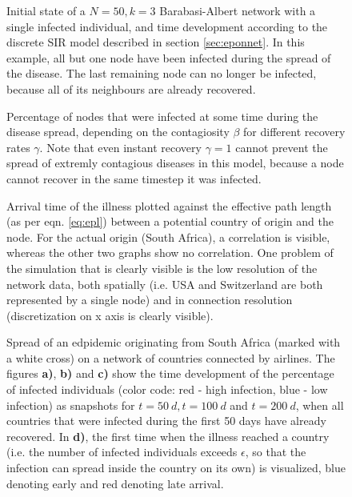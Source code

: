 \documentclass{scrartcl}
\begin{document}
\begin{figure}
    \centering
    \def\svgwidth{0.9\textwidth}
    
    \caption{Initial state of a $N=50, k=3$ Barabasi-Albert network with a single infected individual, and time development according to the discrete SIR model described in section \ref{sec:eponnet}. In this example, all but one node have been infected during the spread of the disease. The last remaining node can no longer be infected, because all of its neighbours are already recovered.}
    \label{fig:D11}
\end{figure}

\begin{figure}
    \centering
    \caption{Percentage of nodes that were infected at some time during the disease spread, 
		depending on the contagiosity $\beta$ for different recovery rates $\gamma$. Note that 
		even instant recovery $\gamma=1$ cannot prevent the spread of extremly contagious diseases
		in this model, because a node cannot recover in the same timestep it was infected.}
    \label{fig:D12}
\end{figure}

\begin{figure}
    \centering
    \caption{Arrival time of the illness plotted against the effective path length  (as per eqn. \ref{eq:epl}) between 
		a potential country of origin and the node. For the actual origin (South Africa), a correlation is visible, whereas the other two graphs show no correlation. One problem of the simulation that is clearly visible is the low resolution of the network data, both spatially (i.e. USA and Switzerland are both represented by a single node) and in connection resolution (discretization on x axis is clearly visible).}
    \label{fig:arrival}
\end{figure}

\begin{figure}
    \centering
    \def\svgwidth{1.0\textwidth}
    
    \caption{Spread of an edpidemic originating from South Africa (marked with a white cross) on a network of countries connected by airlines. The figures \textbf{a)}, \textbf{b)} and \textbf{c)} show the time development of the percentage of infected individuals (color code: red - high infection, blue - low infection) as snapshots for $t=\SI{50}{d}, t=\SI{100}{d}$ and $t=\SI{200}{d}$, when all countries that were infected during the first 50 days have already recovered.
		In \textbf{d)}, the first time when the illness reached a country (i.e. the number of infected individuals exceeds $\epsilon$, so that the infection can spread inside the country on its own) is visualized, blue denoting early and red denoting late arrival. }
    \label{fig:D1spread}
\end{figure}
\end{document}
